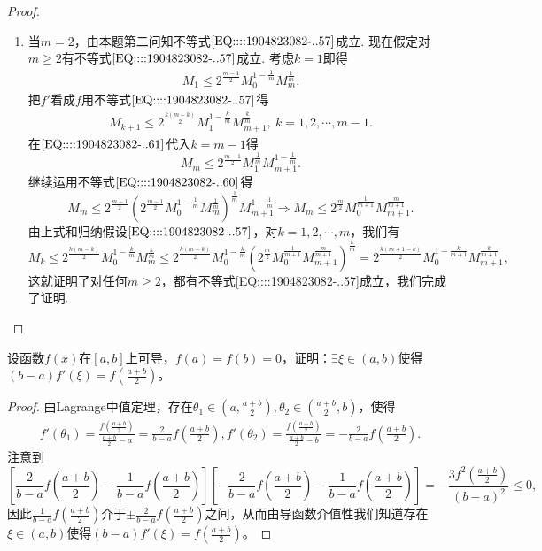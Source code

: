 \documentclass[../../main.tex]{subfiles}
\begin{document}
\begin{proof}
\begin{enumerate}
\item 当\( m = 2 \)，由本题第二问知不等式\(\eqref{EQ::::1904823082-..57}\)成立. 现在假定对\( m \geqslant 2 \)有不等式\(\eqref{EQ::::1904823082-..57}\)成立. 考虑\( k = 1 \)即得
\begin{align}
M_1 \leqslant 2^{\frac{m - 1}{2}} M_0^{1 - \frac{1}{m}} M_m^{\frac{1}{m}}. \label{EQ::::1904823082-..60}
\end{align}
把\( f' \)看成\( f \)用不等式\(\eqref{EQ::::1904823082-..57}\)得
\begin{align}
M_{k + 1} \leqslant 2^{\frac{k(m - k)}{2}} M_1^{1 - \frac{k}{m}} M_{m + 1}^{\frac{k}{m}}, \ k = 1,2,\cdots, m - 1. \label{EQ::::1904823082-..61}
\end{align}
在\(\eqref{EQ::::1904823082-..61}\)代入\( k = m - 1 \)得
\[
M_m \leqslant 2^{\frac{m - 1}{2}} M_1^{\frac{1}{m}} M_{m + 1}^{1 - \frac{1}{m}}.
\]
继续运用不等式\(\eqref{EQ::::1904823082-..60}\)得
\[
M_m \leqslant 2^{\frac{m - 1}{2}} \left( 2^{\frac{m - 1}{2}} M_0^{1 - \frac{1}{m}} M_m^{\frac{1}{m}} \right)^{\frac{1}{m}} M_{m + 1}^{1 - \frac{1}{m}} \Rightarrow M_m \leqslant 2^{\frac{m}{2}} M_0^{\frac{1}{m + 1}} M_{m + 1}^{\frac{m}{m + 1}}.
\]
由上式和归纳假设\(\eqref{EQ::::1904823082-..57}\)，对\( k = 1,2,\cdots, m \)，我们有
\[
M_k \leqslant 2^{\frac{k(m - k)}{2}} M_0^{1 - \frac{k}{m}} M_m^{\frac{k}{m}} \leqslant 2^{\frac{k(m - k)}{2}} M_0^{1 - \frac{k}{m}} \left( 2^{\frac{m}{2}} M_0^{\frac{1}{m + 1}} M_{m + 1}^{\frac{m}{m + 1}} \right)^{\frac{k}{m}} = 2^{\frac{k(m + 1 - k)}{2}} M_0^{1 - \frac{k}{m + 1}} M_{m + 1}^{\frac{k}{m + 1}},
\]
这就证明了对任何\( m \geqslant 2 \)，都有不等式\eqref{EQ::::1904823082-..57}成立，我们完成了证明.
\end{enumerate}
\end{proof}

\begin{example}
设函数$f(x)$在$[a,b]$上可导，$f(a)=f(b)=0$，证明：$\exists \xi \in (a,b)$使得$(b - a)f'(\xi)=f\left(\frac{a + b}{2}\right)$。
\end{example}
\begin{proof}
由Lagrange中值定理，存在$ \theta_1 \in \left( a,\frac{a+b}{2} \right) ,\theta_2 \in \left( \frac{a+b}{2},b \right) $，使得
\begin{align*}
f'(\theta_1)=\frac{f\left( \frac{a+b}{2} \right)}{\frac{a+b}{2}-a}=\frac{2}{b-a}f\left( \frac{a+b}{2} \right) , f'(\theta_2)=\frac{f\left( \frac{a+b}{2} \right)}{\frac{a+b}{2}-b}=-\frac{2}{b-a}f\left( \frac{a+b}{2} \right) .
\end{align*}
注意到
$$\left[\frac{2}{b - a}f\left(\frac{a + b}{2}\right)-\frac{1}{b - a}f\left(\frac{a + b}{2}\right)\right]\left[-\frac{2}{b - a}f\left(\frac{a + b}{2}\right)-\frac{1}{b - a}f\left(\frac{a + b}{2}\right)\right]=-\frac{3f^2\left(\frac{a + b}{2}\right)}{(b - a)^2}\leqslant 0,$$
因此$\frac{1}{b - a}f\left(\frac{a + b}{2}\right)$介于$\pm \frac{2}{b - a}f\left(\frac{a + b}{2}\right)$之间，从而由导函数介值性我们知道存在$\xi \in (a,b)$使得$(b - a)f'(\xi)=f\left(\frac{a + b}{2}\right)$。
\end{proof}
\end{document}
